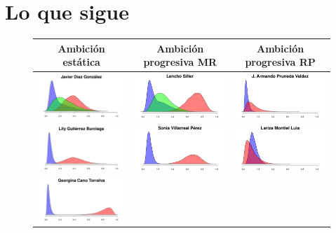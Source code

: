 \documentclass[letter,12pt]{article}
\begin{document}
\section{Lo que sigue}

\begin{figure}
  \centering
  \begin{tabular}{ccc}
    Ambición estática & Ambición progresiva MR & Ambición progresiva RP \\ \hline
    \includegraphics[width=.3\columnwidth]{../graphs/prReconoce1.pdf} &
    \includegraphics[width=.3\columnwidth]{../graphs/prReconoce6.pdf} &
    \includegraphics[width=.3\columnwidth]{../graphs/prReconoce8.pdf} \\
    \includegraphics[width=.3\columnwidth]{../graphs/prReconoce2.pdf} &
    \includegraphics[width=.3\columnwidth]{../graphs/prReconoce5.pdf} &
    \includegraphics[width=.3\columnwidth]{../graphs/prReconoce7.pdf} \\
    \includegraphics[width=.3\columnwidth]{../graphs/prReconoce3.pdf} &

\end{tabular}
\end{figure}
\end{document}
